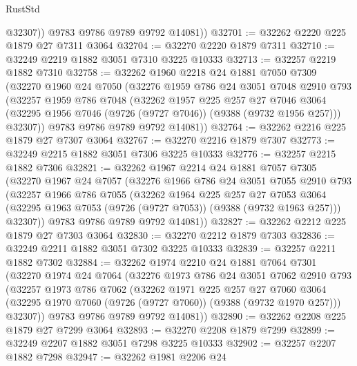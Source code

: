 \begin{lexlean}{RustStd}
\begin{coremodule}
            @32307))
        @9783
        @9786
        @9789
        @9792
        @14081))
@32701 := @32262 @2220 @225 @1879 @27 @7311 @3064
@32704 := @32270 @2220 @1879 @7311
@32710 := @32249 @2219 @1882 @3051 @7310 @3225 @10333
@32713 := @32257 @2219 @1882 @7310
@32758 := @32262
    @1960
    @2218
    @24
    @1881
    @7050
    @7309
    (@32270
      @1960
      @24
      @7050
      (@32276
        @1959
        @786
        @24
        @3051
        @7048
        @2910
        @793
        (@32257
          @1959
          @786
          @7048
          (@32262
            @1957
            @225
            @257
            @27
            @7046
            @3064
            (@32295 @1956 @7046 (@9726 (@9727 @7046)) (@9388 (@9732 @1956 @257)))
            @32307))
        @9783
        @9786
        @9789
        @9792
        @14081))
@32764 := @32262 @2216 @225 @1879 @27 @7307 @3064
@32767 := @32270 @2216 @1879 @7307
@32773 := @32249 @2215 @1882 @3051 @7306 @3225 @10333
@32776 := @32257 @2215 @1882 @7306
@32821 := @32262
    @1967
    @2214
    @24
    @1881
    @7057
    @7305
    (@32270
      @1967
      @24
      @7057
      (@32276
        @1966
        @786
        @24
        @3051
        @7055
        @2910
        @793
        (@32257
          @1966
          @786
          @7055
          (@32262
            @1964
            @225
            @257
            @27
            @7053
            @3064
            (@32295 @1963 @7053 (@9726 (@9727 @7053)) (@9388 (@9732 @1963 @257)))
            @32307))
        @9783
        @9786
        @9789
        @9792
        @14081))
@32827 := @32262 @2212 @225 @1879 @27 @7303 @3064
@32830 := @32270 @2212 @1879 @7303
@32836 := @32249 @2211 @1882 @3051 @7302 @3225 @10333
@32839 := @32257 @2211 @1882 @7302
@32884 := @32262
    @1974
    @2210
    @24
    @1881
    @7064
    @7301
    (@32270
      @1974
      @24
      @7064
      (@32276
        @1973
        @786
        @24
        @3051
        @7062
        @2910
        @793
        (@32257
          @1973
          @786
          @7062
          (@32262
            @1971
            @225
            @257
            @27
            @7060
            @3064
            (@32295 @1970 @7060 (@9726 (@9727 @7060)) (@9388 (@9732 @1970 @257)))
            @32307))
        @9783
        @9786
        @9789
        @9792
        @14081))
@32890 := @32262 @2208 @225 @1879 @27 @7299 @3064
@32893 := @32270 @2208 @1879 @7299
@32899 := @32249 @2207 @1882 @3051 @7298 @3225 @10333
@32902 := @32257 @2207 @1882 @7298
@32947 := @32262
    @1981
    @2206
    @24

\end{coremodule}
\end{lexlean}
